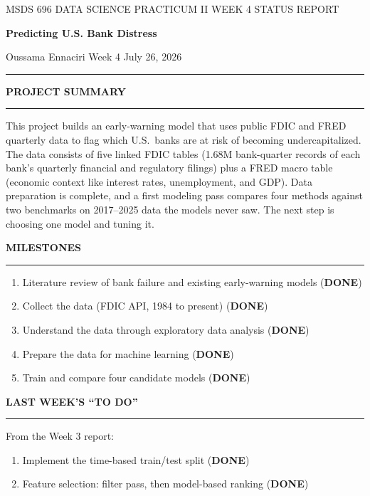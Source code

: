\documentclass[11pt,letterpaper]{article}
\newcommand{\sectionhead}[1]{%
  \vspace{6pt}%
  {\sffamily\bfseries\fontsize{9.5}{12}\selectfont\color{navy}\MakeUppercase{#1}}\par
  \vspace{-9pt}\textcolor{hairline}{\rule{\textwidth}{0.5pt}}\par\vspace{0pt}}
\newcommand{\answer}[1]{#1\par\vspace{3pt}}
\begin{document}
\vspace*{-14pt}
{\sffamily\fontsize{8.5}{11}\selectfont\color{midgray}MSDS 696 DATA SCIENCE PRACTICUM II \quad\textbar\quad WEEK 4 STATUS REPORT}\par\vspace{10pt}
{\sffamily\bfseries\fontsize{21}{25}\selectfont\color{navy}Predicting U.S. Bank Distress}\par\vspace{9pt}
{\sffamily\fontsize{9}{12}\selectfont Oussama Ennaciri \quad\textbar\quad Week 4 \quad\textbar\quad July 26, 2026}\par\vspace{5pt}
\textcolor{navy}{\rule{\textwidth}{1.2pt}}

\sectionhead{Project summary}
\answer{This project builds an early-warning model that uses public FDIC and FRED quarterly data to flag which U.S.\ banks are at risk of becoming undercapitalized. The data consists of five linked FDIC tables (1.68M bank-quarter records of each bank's quarterly financial and regulatory filings) plus a FRED macro table (economic context like interest rates, unemployment, and GDP). Data preparation is complete, and a first modeling pass compares four methods against two benchmarks on 2017--2025 data the models never saw. The next step is choosing one model and tuning it.}

\sectionhead{Milestones}
\answer{\begin{enumerate}[topsep=1pt,itemsep=1pt,leftmargin=16pt,label=\textcolor{navy}{\bfseries\arabic*.}]
  \item Literature review of bank failure and existing early-warning models (\textbf{DONE})
  \item Collect the data (FDIC API, 1984 to present) (\textbf{DONE})
  \item Understand the data through exploratory data analysis (\textbf{DONE})
  \item Prepare the data for machine learning (\textbf{DONE})
  \item Train and compare four candidate models (\textbf{DONE})
\end{enumerate}}

\sectionhead{Last week's ``To Do''}
\answer{From the Week 3 report:
\begin{enumerate}[topsep=1pt,itemsep=1pt,leftmargin=16pt,label=\textcolor{navy}{\bfseries\arabic*.}]
  \item Implement the time-based train/test split (\textbf{DONE})
  \item Feature selection: filter pass, then model-based ranking (\textbf{DONE})
\end{enumerate}}
\end{document}

